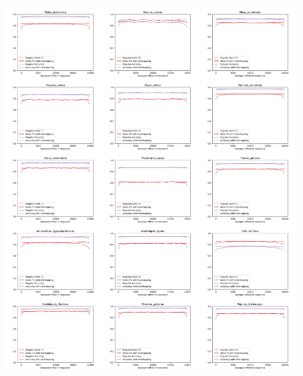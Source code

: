 \documentclass{article}
\begin{document}
\begin{figure}[!h]
\centerline{\includegraphics[width=\overlapscale\textwidth]{images/overlapping/montage_plants2}}
\end{figure}
\end{document}
